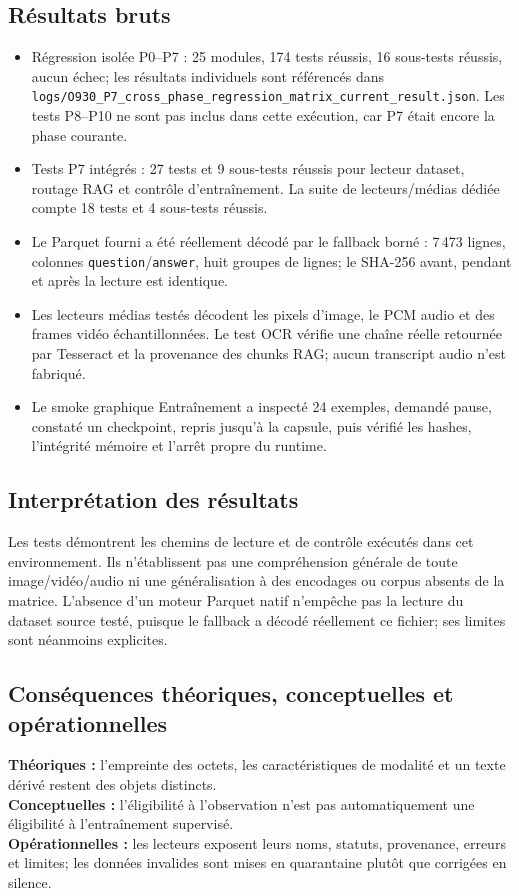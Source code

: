 \documentclass[11pt,a4paper]{report}
\begin{document}
\subsection{Résultats bruts}
\begin{itemize}
\item Régression isolée P0--P7 : 25 modules, 174 tests réussis, 16 sous-tests réussis, aucun échec; les résultats individuels sont référencés dans \texttt{logs/O930\_P7\_cross\_phase\_regression\_matrix\_current\_result.json}. Les tests P8--P10 ne sont pas inclus dans cette exécution, car P7 était encore la phase courante.
\item Tests P7 intégrés : 27 tests et 9 sous-tests réussis pour lecteur dataset, routage RAG et contrôle d'entraînement. La suite de lecteurs/médias dédiée compte 18 tests et 4 sous-tests réussis.
\item Le Parquet fourni a été réellement décodé par le fallback borné : 7\,473 lignes, colonnes \texttt{question}/\texttt{answer}, huit groupes de lignes; le SHA-256 avant, pendant et après la lecture est identique.
\item Les lecteurs médias testés décodent les pixels d'image, le PCM audio et des frames vidéo échantillonnées. Le test OCR vérifie une chaîne réelle retournée par Tesseract et la provenance des chunks RAG; aucun transcript audio n'est fabriqué.
\item Le smoke graphique Entraînement a inspecté 24 exemples, demandé pause, constaté un checkpoint, repris jusqu'à la capsule, puis vérifié les hashes, l'intégrité mémoire et l'arrêt propre du runtime.
\end{itemize}

\subsection{Interprétation des résultats}
Les tests démontrent les chemins de lecture et de contrôle exécutés dans cet environnement. Ils n'établissent pas une compréhension générale de toute image/vidéo/audio ni une généralisation à des encodages ou corpus absents de la matrice. L'absence d'un moteur Parquet natif n'empêche pas la lecture du dataset source testé, puisque le fallback a décodé réellement ce fichier; ses limites sont néanmoins explicites.

\subsection{Conséquences théoriques, conceptuelles et opérationnelles}
\textbf{Théoriques :} l'empreinte des octets, les caractéristiques de modalité et un texte dérivé restent des objets distincts.\\
\textbf{Conceptuelles :} l'éligibilité à l'observation n'est pas automatiquement une éligibilité à l'entraînement supervisé.\\
\textbf{Opérationnelles :} les lecteurs exposent leurs noms, statuts, provenance, erreurs et limites; les données invalides sont mises en quarantaine plutôt que corrigées en silence.
\end{document}

